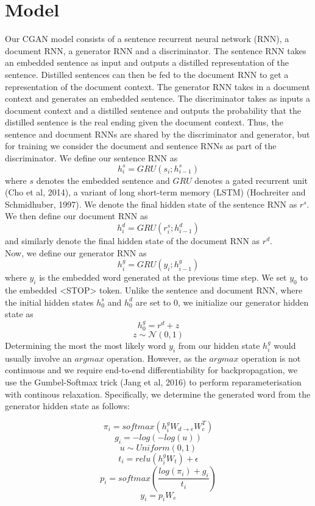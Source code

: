 \documentclass{article}
\begin{document}
\section{Model}
Our CGAN model consists of a sentence recurrent neural network (RNN), a document RNN, a generator RNN and a discriminator. The sentence RNN takes an embedded sentence as input and outputs a distilled representation of the sentence. Distilled sentences can then be fed to the document RNN to get a representation of the document context. The generator RNN takes in a document context and generates an embedded sentence. The discriminator takes as inputs a document context and a distilled sentence and outputs the probability that the distilled sentence is the real ending given the document context. Thus, the sentence and document RNNs are shared by the discriminator and generator, but for training we consider the document and sentence RNNs as part of the discriminator.
We define our sentence RNN as
$$ h^{s}_{i} = GRU(s_{i}; h^{s}_{i-1})$$
where $s$ denotes the embedded sentence and $GRU$ denotes a gated recurrent unit (Cho et al, 2014), a variant of long short-term memory (LSTM) (Hochreiter and Schmidhuber, 1997). We denote the final hidden state of the sentence RNN as $r^{s}$. \\
We then define our document RNN as
$$ h^{d}_{i} = GRU(r^{s}_{i}; h^{d}_{i-1}) $$
and similarly denote the final hidden state of the document RNN as $r^{d}$. \\
Now, we define our generator RNN as
$$ h^{g}_{i} = GRU(y_{i}; h^{g}_{i-1}) $$
where $y_{i}$ is the embedded word generated at the previous time step. We set $y_{0}$ to the embedded <STOP> token. Unlike the sentence and document RNN, where the initial hidden states $h^{s}_{0}$ and $h^{d}_{0}$ are set to 0, we initialize our generator hidden state as
$$ h^{g}_{0} = r^{d} + z $$
$$ z \sim \mathcal{N}(0,1) $$
Determining the most the most likely word $y_{i}$ from our hidden state $h^{g}_{i}$ would usually involve an $argmax$ operation. However, as the $argmax$ operation is not continuous and we require end-to-end differentiability for backpropagation, we use the Gumbel-Softmax trick (Jang et al, 2016) to perform reparameterisation with continous relaxation. Specifically, we determine the generated word from the generator hidden state as follows:

$$ \pi_{i} = softmax(h^{g}_{i}W_{d \rightarrow e}W_{e}^{T})$$
$$ g_{i} = -log(-log(u)) $$
$$ u \sim Uniform(0,1) $$
$$ t_{i} = relu(h^{g}_{i}W_{t}) + \epsilon $$
$$ p_{i} = softmax(\frac{log(\pi_{i}) + g_{i}}{t_{i}}) $$
$$ y_{i} = p_{i}W_{e}$$
\end{document}
